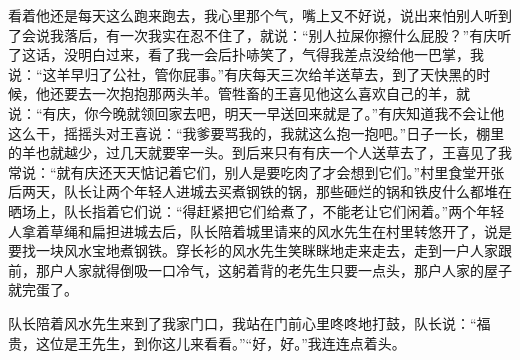 \documentclass[12pt,UTF8]{ctexbook}
\begin{document}
看着他还是每天这么跑来跑去，我心里那个气，嘴上又不好说，说出来怕别人听到了会说我落后，有一次我实在忍不住了，就说：“别人拉屎你擦什么屁股？”有庆听了这话，没明白过来，看了我一会后扑哧笑了，气得我差点没给他一巴掌，我说：“这羊早归了公社，管你屁事。”有庆每天三次给羊送草去，到了天快黑的时候，他还要去一次抱抱那两头羊。管牲畜的王喜见他这么喜欢自己的羊，就说：“有庆，你今晚就领回家去吧，明天一早送回来就是了。”有庆知道我不会让他这么干，摇摇头对王喜说：“我爹要骂我的，我就这么抱一抱吧。”日子一长，棚里的羊也就越少，过几天就要宰一头。到后来只有有庆一个人送草去了，王喜见了我常说：“就有庆还天天惦记着它们，别人是要吃肉了才会想到它们。”村里食堂开张后两天，队长让两个年轻人进城去买煮钢铁的锅，那些砸烂的锅和铁皮什么都堆在晒场上，队长指着它们说：“得赶紧把它们给煮了，不能老让它们闲着。”两个年轻人拿着草绳和扁担进城去后，队长陪着城里请来的风水先生在村里转悠开了，说是要找一块风水宝地煮钢铁。穿长衫的风水先生笑眯眯地走来走去，走到一户人家跟前，那户人家就得倒吸一口冷气，这躬着背的老先生只要一点头，那户人家的屋子就完蛋了。

队长陪着风水先生来到了我家门口，我站在门前心里咚咚地打鼓，队长说：“福贵，这位是王先生，到你这儿来看看。”“好，好。”我连连点着头。
\end{document}
